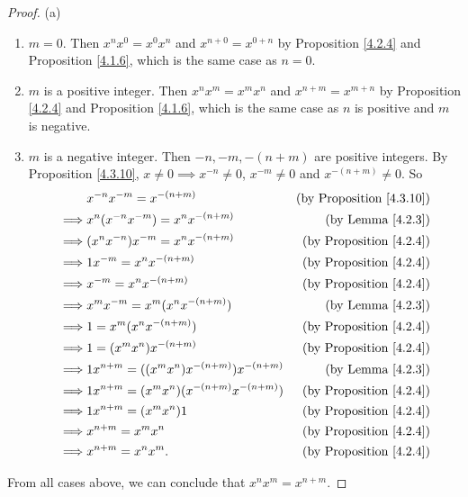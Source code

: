 \begin{proof}{(a)}
\begin{enumerate}[label=(\Roman*)]
    \begin{enumerate}[label=(\roman*)]
        \item \(m = 0\).
        Then \(x^n x^0 = x^0 x^n\) and \(x^{n + 0} = x^{0 + n}\) by Proposition \ref{4.2.4} and Proposition \ref{4.1.6}, which is the same case as \(n = 0\).
        \item \(m\) is a positive integer.
        Then \(x^n x^m = x^m x^n\) and \(x^{n + m} = x^{m + n}\) by Proposition \ref{4.2.4} and Proposition \ref{4.1.6}, which is the same case as \(n\) is positive and \(m\) is negative.
        \item \(m\) is a negative integer.
        Then \(-n, -m, -(n + m)\) are positive integers.
        By Proposition \ref{4.3.10}, \(x \neq 0 \implies x^{-n} \neq 0\), \(x^{-m} \neq 0\) and \(x^{-(n + m)} \neq 0\).
        So
        \begin{align*}
        & x^{-n} x^{-m} = x^{-(n + m)} & \text{(by Proposition \ref{4.3.10})} \\
        \implies & x^n (x^{-n} x^{-m}) = x^n x^{-(n + m)} & \text{(by Lemma \ref{4.2.3})} \\
        \implies & (x^n x^{-n}) x^{-m} = x^n x^{-(n + m)} & \text{(by Proposition \ref{4.2.4})} \\
        \implies & 1x^{-m} = x^n x^{-(n + m)} & \text{(by Proposition \ref{4.2.4})} \\
        \implies & x^{-m} = x^n x^{-(n + m)} & \text{(by Proposition \ref{4.2.4})} \\
        \implies & x^m x^{-m} = x^m (x^n x^{-(n + m)}) & \text{(by Lemma \ref{4.2.3})} \\
        \implies & 1 = x^m (x^n x^{-(n + m)}) & \text{(by Proposition \ref{4.2.4})} \\
        \implies & 1 = (x^m x^n) x^{-(n + m)} & \text{(by Proposition \ref{4.2.4})} \\
        \implies & 1x^{n + m} = ((x^m x^n) x^{-(n + m)})x^{-(n + m)} & \text{(by Lemma \ref{4.2.3})} \\
        \implies & 1x^{n + m} = (x^m x^n)(x^{-(n + m)} x^{-(n + m)}) & \text{(by Proposition \ref{4.2.4})} \\
        \implies & 1x^{n + m} = (x^m x^n)1 & \text{(by Proposition \ref{4.2.4})} \\
        \implies & x^{n + m} = x^m x^n & \text{(by Proposition \ref{4.2.4})} \\
        \implies & x^{n + m} = x^n x^m. & \text{(by Proposition \ref{4.2.4})}
        \end{align*}
    \end{enumerate}
\end{enumerate}
From all cases above, we can conclude that \(x^n x^m = x^{n + m}\).


\end{proof}
